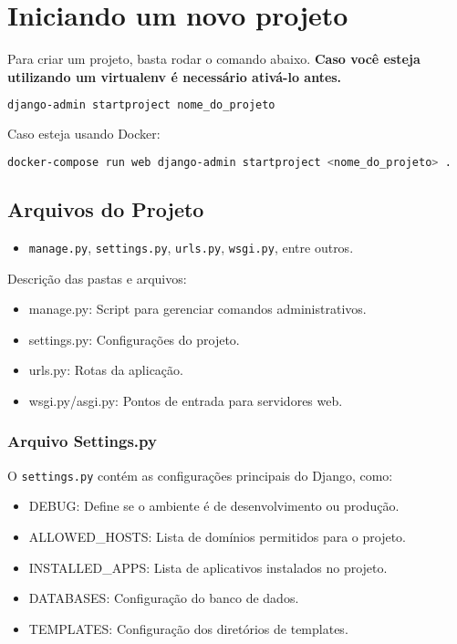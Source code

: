\section{Iniciando um novo projeto}

Para criar um projeto, basta rodar o comando abaixo. \textbf{Caso voc\^{e} esteja utilizando um virtualenv \'{e} necess\'ario ativ\'a-lo antes.}

\begin{lstlisting}[language=bash]
django-admin startproject nome_do_projeto
\end{lstlisting}

Caso esteja usando Docker:
\begin{lstlisting}[language=bash]
docker-compose run web django-admin startproject <nome_do_projeto> .
\end{lstlisting}

\subsection{Arquivos do Projeto}
\begin{itemize}
  \item \texttt{manage.py}, \texttt{settings.py}, \texttt{urls.py}, \texttt{wsgi.py}, entre outros.
\end{itemize}

Descri\c{c}\~ao das pastas e arquivos:
\begin{itemize}
    \item manage.py: Script para gerenciar comandos administrativos.
    \item settings.py: Configura\c{c}\~oes do projeto.
    \item urls.py: Rotas da aplica\c{c}\~ao.
    \item wsgi.py/asgi.py: Pontos de entrada para servidores web.
\end{itemize}

\subsubsection*{Arquivo Settings.py}
O \texttt{settings.py} cont\'em as configura\c{c}\~oes principais do Django, como:
\begin{itemize}
    \item DEBUG: Define se o ambiente \'{e} de desenvolvimento ou produ\c{c}\~ao.
    \item ALLOWED\_HOSTS: Lista de dom\'{i}nios permitidos para o projeto.
    \item INSTALLED\_APPS: Lista de aplicativos instalados no projeto.
    \item DATABASES: Configura\c{c}\~ao do banco de dados.
    \item TEMPLATES: Configura\c{c}\~ao dos diret\'orios de templates.
\end{itemize}

